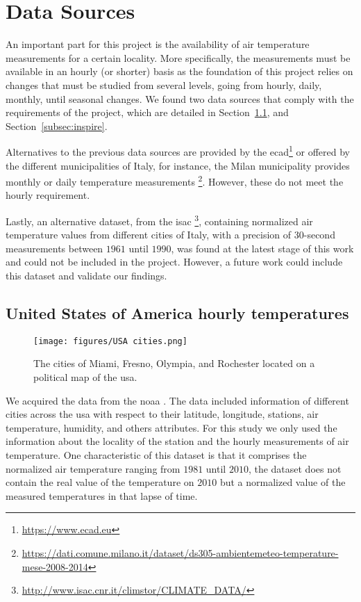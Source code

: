\documentclass{article}
\begin{document}
\section{Data Sources}

An important part for this project is the availability of air temperature measurements for a certain locality. More specifically, the measurements must be available in an hourly (or shorter) basis as the foundation of this project relies on changes that must be studied from several levels, going from hourly, daily, monthly, until seasonal changes. We found two data sources that comply with the requirements of the project, which are detailed in Section~\ref{subsec:noaa}, and Section~\ref{subsec:inspire}. 

Alternatives to the previous data sources are provided by the \gls{ecad}\footnote{\url{https://www.ecad.eu}} or offered by the different municipalities of Italy, for instance, the Milan municipality provides monthly or daily temperature measurements \footnote{\url{https://dati.comune.milano.it/dataset/ds305-ambientemeteo-temperature-mese-2008-2014}}. However, these do not meet the hourly requirement.

Lastly, an alternative dataset, from the \gls{isac} \footnote{\url{http://www.isac.cnr.it/climstor/CLIMATE_DATA/}}, containing normalized air temperature values from different cities of Italy, with a precision of 30-second measurements between $1961$ until $1990$, was found at the latest stage of this work and could not be included in the project. However, a future work could include this dataset and validate our findings.

\subsection{United States of America hourly temperatures}
\label{subsec:noaa}

\begin{figure}[ht]
\centering
\texttt{[image: figures/USA cities.png]}
\caption{The cities of Miami, Fresno, Olympia, and Rochester located on a political map of the \gls{usa}.}
\label{fig:USA cities}
\end{figure}

We acquired the data from the \gls{noaa} \cite{noaa2010dataset}. The data included information of different cities across the \gls{usa} with respect to their latitude, longitude, stations, air temperature, humidity, and others attributes. For this study we only used the information about the locality of the station and the hourly measurements of air temperature. One characteristic of this dataset is that it comprises the normalized air temperature ranging from $1981$ until $2010$, \idest the dataset does not contain the real value of the temperature on $2010$ but a normalized value of the measured temperatures in that lapse of time.
\end{document}
